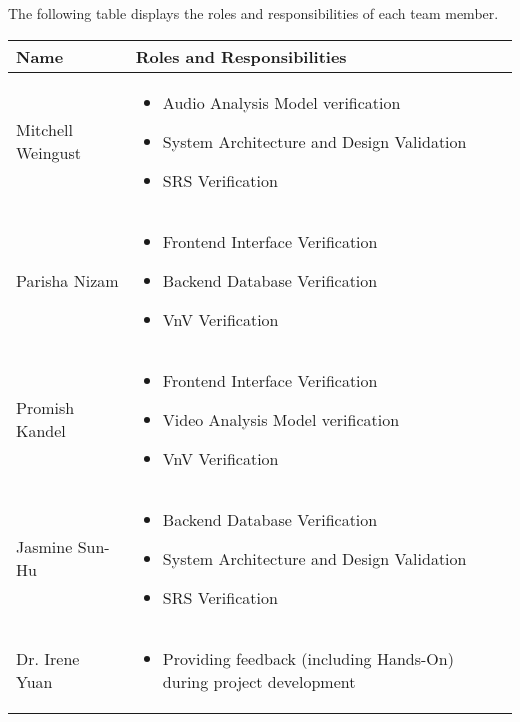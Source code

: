 \documentclass[12pt, titlepage]{article}
\begin{document}
\hspace{2em}The following table displays the roles and responsibilities of each team member.

\begin{table}[h!]
  \centering
  \begin{tabular}{ | m{5cm} | m{8cm} | }
    \toprule
    Name & Roles and Responsibilities \\
    \hline
    Mitchell Weingust & \vspace{2mm}\begin{itemize}
      \item Audio Analysis Model verification
      \item System Architecture and Design Validation
      \item SRS Verification
    \end{itemize}\\
    \hline
    Parisha Nizam & \vspace{2mm}\begin{itemize}
      \item Frontend Interface Verification
      \item Backend Database Verification
      \item VnV Verification
    \end{itemize}\\
    \hline
    Promish Kandel & \vspace{2mm}\begin{itemize}
      \item Frontend Interface Verification
      \item Video Analysis Model verification
      \item VnV Verification
    \end{itemize}\\
    \hline
    Jasmine Sun-Hu & \vspace{2mm}\begin{itemize}
      \item Backend Database Verification
      \item System Architecture and Design Validation
      \item SRS Verification
    \end{itemize}\\
    \hline
    Dr. Irene Yuan & \vspace{2mm}\begin{itemize}
      \item Providing feedback (including Hands-On) during project development

\end{itemize}
\end{tabular}
\end{table}
\end{document}
